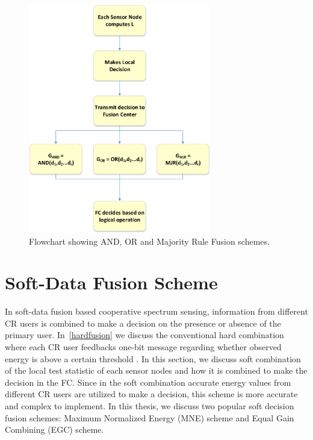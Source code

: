 \begin{figure}[ht!]
	\centering
	\includegraphics[width=\textwidth,height=10cm,keepaspectratio]{images/Gill/figs/hardfusion.eps}
\caption{Flowchart showing AND, OR and Majority Rule Fusion schemes.} 
\label{hard}      
\end{figure}

\section{Soft-Data Fusion Scheme}

In soft-data fusion based cooperative spectrum sensing, information from different CR users is combined to make a decision on the presence or absence of the primary user.
In~\ref{hardfusion} we discuss the conventional hard combination where each CR user feedbacks one-bit message regarding whether observed energy is above a certain threshold . In this section, we discuss soft combination of the local test statistic of each sensor nodes and how it is combined to make the decision in the FC. Since in the soft combination accurate energy values from different CR users are utilized to make a decision, this scheme is more accurate and complex to implement. In this thesis, we discuss two popular soft decision fusion schemes: Maximum Normalized Energy (MNE) scheme and Equal Gain Combining (EGC) scheme.

